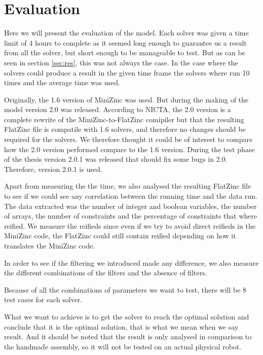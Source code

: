 \chapter{Evaluation}\label{cha:eval}
Here we will present the evaluation of the model. Each solver was given a time limit of 4 hours to complete as it seemed long enough to guarantee us a result from all the solver, but short enough to be manageable to test. But as can be seen in section \ref{sec:res}, this was not always the case. In the case where the solvers could produce a result in the given time frame the solvers where run 10 times and the average time was used.

Originally, the 1.6 version of MiniZinc was used. But during the making of the model version 2.0 was released. According to NICTA, the 2.0 version is a complete rewrite of the MiniZinc-to-FlatZinc comipiler but that the resulting FlatZinc file is compatile with 1.6 solvers, and therefore no changes should be required for the solvers.\cite{mz2} We therefore thought it could be of interest to compare how the 2.0 version performed compare to the 1.6 version. During the test phase of the thesis version 2.0.1 was released that should fix some bugs in 2.0.\cite{mz2_changelog} Therefore, version 2.0.1 is used.

Apart from measuring the the time, we also analysed the resulting FlatZinc file to see if we could see any correlation between the running time and the data run. The data extracted was the number of integer and boolean variables, the number of arrays, the number of constraints and the percentage of constraints that where reified. We measure the reifieds since even if we try to avoid direct reifieds in the MiniZinc code, the FlatZinc could still contain reified depending on how it translates the MiniZinc code.

In order to see if the filtering we introduced made any difference, we also measure the different combinations of the filters and the absence of filters.

Because of all the combinations of parameters we want to test, there will be 8 test cases for each solver.

What we want to achieve is to get the solver to reach the optimal solution and conclude that it is the optimal solution, that is what we mean when we say result. And it should be noted that the result is only analysed in comparison to the handmade assembly, so it will not be tested on an actual physical robot.

